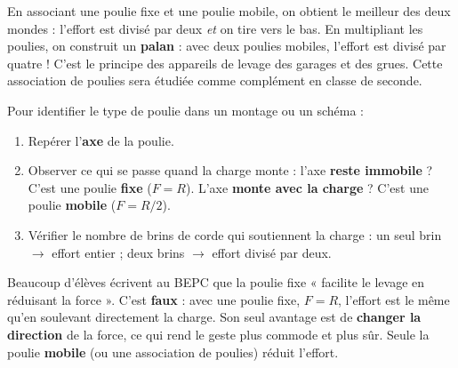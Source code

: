 \documentclass[11pt]{article}
\begin{document}
\begin{savaistu}
En associant une poulie fixe et une poulie mobile, on obtient le meilleur des deux mondes : l'effort est divisé par deux \emph{et} on tire vers le bas. En multipliant les poulies, on construit un \textbf{palan} : avec deux poulies mobiles, l'effort est divisé par quatre ! C'est le principe des appareils de levage des garages et des grues. Cette association de poulies sera étudiée comme complément en classe de seconde.
\end{savaistu}

\begin{methode}
Pour identifier le type de poulie dans un montage ou un schéma :
\begin{enumerate}
\item Repérer l'\textbf{axe} de la poulie.
\item Observer ce qui se passe quand la charge monte : l'axe \textbf{reste immobile} ? C'est une poulie \textbf{fixe} ($F = R$). L'axe \textbf{monte avec la charge} ? C'est une poulie \textbf{mobile} ($F = R/2$).
\item Vérifier le nombre de brins de corde qui soutiennent la charge : un seul brin $\rightarrow$ effort entier ; deux brins $\rightarrow$ effort divisé par deux.
\end{enumerate}
\end{methode}

\begin{attention}
Beaucoup d'élèves écrivent au BEPC que la poulie fixe « facilite le levage en réduisant la force ». C'est \textbf{faux} : avec une poulie fixe, $F = R$, l'effort est le même qu'en soulevant directement la charge. Son seul avantage est de \textbf{changer la direction} de la force, ce qui rend le geste plus commode et plus sûr. Seule la poulie \textbf{mobile} (ou une association de poulies) réduit l'effort.
\end{attention}
\end{document}
